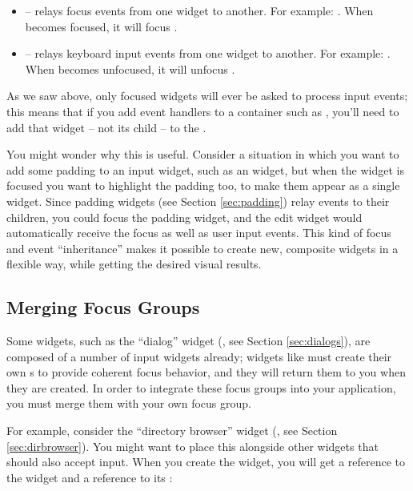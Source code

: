\begin{itemize}
\item {} -- relays focus events from one widget to
  another.  For example: .
  When  becomes focused, it will focus .
\item {} -- relays keyboard input events from one
  widget to another.  For example: .  When  becomes unfocused, it will unfocus
  .
\end{itemize}

As we saw above, only focused widgets will ever be asked to process
input events; this means that if you add event handlers to a container
such as , you'll need to add that widget -- not its child
-- to the .

You might wonder why this is useful.  Consider a situation in which
you want to add some padding to an input widget, such as an 
widget, but when the  widget is focused you want to highlight
the padding too, to make them appear as a single widget.  Since
padding widgets (see Section \ref{sec:padding}) relay events to their
children, you could focus the padding widget, and the edit widget would
automatically receive the focus as well as user input events.  This
kind of focus and event ``inheritance'' makes it possible to create
new, composite widgets in a flexible way, while getting the desired
visual results.

\subsection{Merging Focus Groups}
\label{sec:merging_focus_groups}

Some widgets, such as the ``dialog'' widget (, see Section
\ref{sec:dialogs}), are composed of a number of input widgets already;
widgets like  must create their own s to
provide coherent focus behavior, and they will return them to you when
they are created.  In order to integrate these focus groups into your
application, you must merge them with your own focus group.

For example, consider the ``directory browser'' widget
(, see Section \ref{sec:dirbrowser}).  You might want
to place this alongside other widgets that should also accept input.
When you create the  widget, you will get a reference
to the widget and a reference to its :

